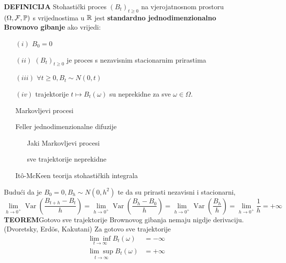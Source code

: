 \documentclass{article}
\newcommand{\Var}{\operatorname{Var}}
\begin{document}
\textbf{DEFINICIJA}\newline
Stohastički proces \((B_t)_{t\ge0}\) na vjerojatnosnom prostoru \((\Omega,\mathcal F,\Bbb P)\) s vrijednostima u \(\Bbb R\) jest \textbf{standardno jednodimenzionalno Brownovo gibanje} ako vrijedi:
\begin{enumerate}
    \item[\((i)\)] \(B_0=0\)
    \item[\((ii)\)] \((B_t)_{t\ge0}\) je proces s nezavisnim stacionarnim prirastima
    \item[\((iii)\)] \(\forall t\ge0, B_t\sim N(0,t)\)
    \item[\((iv)\)] trajektorije \(t\mapsto B_t(\omega)\) su neprekidne za sve \(\omega\in\Omega.\)
\end{enumerate}
\begin{enumerate}
    \item[\ding{228}] Markovljevi procesi
    \item[\ding{228}] Feller  jednodimenzionalne difuzije\begin{enumerate}
        \item[\ding{46}] Jaki Markovljevi procesi
        \item[\ding{46}] sve trajektorije neprekidne
    \end{enumerate}
    \item[\ding{228}] It\^o-McKeen  teorija stohastičkih integrala
\end{enumerate}
Budući da je \(B_0=0, B_h\sim N(0,h^2)\) te da su prirasti nezavisni i stacionarni, \[\lim_{h\to 0^+}\Var\left(\frac{B_{t+h}-B_t}h\right)=\lim_{h\to0^+}\Var\left(\frac{B_h-B_0}h\right)=\lim_{h\to0^+}\Var\left(\frac{B_h}h\right)=\lim_{h\to0^+}\frac1h=+\infty\]
\textbf{TEOREM}\newline Gotovo sve trajektorije Brownovog gibanja nemaju nigdje derivaciju. (Dvoretsky, Erd\"{o}s, Kakutani)\newline\newline
Za gotovo sve trajektorije \[\begin{aligned}\underset{t\to\infty}{\lim\inf}B_t(\omega)&=-\infty\\\underset{t\to\infty}{\lim\sup}B_t(\omega)&=+\infty\end{aligned}\]
\end{document}
